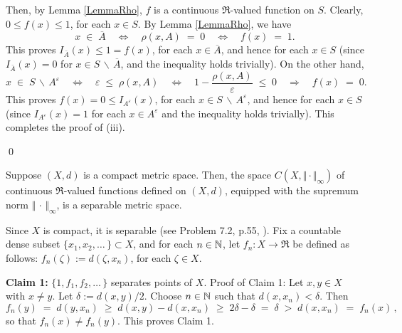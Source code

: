\begin{enumerate}
	Then, by Lemma \ref{LemmaRho}, $f$ is a continuous $\Re$-valued function on $S$.
	Clearly, $0 \leq f(x) \leq 1$, for each $x \in S$.
	By Lemma \ref{LemmaRho}, we have
	\begin{equation*}
	x \;\in\; \overline{A}
	\quad\Longleftrightarrow\quad
	\rho(x,A) \;=\; 0
	\quad\Longleftrightarrow\quad
	f(x) \; = \; 1.
	\end{equation*}
	This proves $I_{\bar{A}}(x) \leq 1 = f(x)$, for each $x \in \overline{A}$, and hence for each $x \in S$
	(since $I_{\bar{A}}(x) = 0$ for $x \in S\,\backslash\,\overline{A}$, and the inequality holds trivially).
	On the other hand,
	\begin{equation*}
	x \;\in\; S\,\backslash\,A^{\varepsilon}
	\quad\Longleftrightarrow\quad
	\varepsilon \;\leq\; \rho(x,A)
	\quad\Longleftrightarrow\quad
	1 - \dfrac{\rho(x,A)}{\varepsilon} \;\leq\; 0
	\quad\Longrightarrow\quad
	f(x) \;=\; 0.
	\end{equation*}
	This proves $f(x) = 0 \leq I_{A^{\varepsilon}}(x)$, for each $x \in S\,\backslash\,A^{\varepsilon}$,
	and hence for each $x \in S$ (since $I_{A^{\varepsilon}}(x) = 1$ for each $x \in A^{\varepsilon}$
	and the inequality holds trivially).
	This completes the proof of (iii).
\end{enumerate}
\qed


\begin{proposition}
\label{XCompactImpliesCXSeparable}
\mbox{}\vskip 0.1cm
\noindent
Suppose $(X,d)$ is a compact metric space.
Then, the space $C(X,\Vert\cdot\Vert_{\infty})$ of continuous $\Re$-valued
functions defined on $(X,d)$, equipped with the supremum norm $\Vert\,\cdot\,\Vert_{\infty}$,
is a separable metric space.
\end{proposition}
\proof
Since $X$ is compact, it is separable (see Problem 7.2, p.55, \cite{Aliprantis1998}).
Fix a countable dense subset $\{x_{1},x_{2},\ldots\,\} \subset X$, and
for each $n \in \mathbb{N}$, let $f_{n} : X \longrightarrow \Re$ be defined as follows:
$f_{n}(\zeta) := d(\zeta,x_{n})$, for each $\zeta \in X$.

\vskip 0.5cm
\noindent
\textbf{Claim 1:}\;\; $\{1, f_{1}, f_{2}, \ldots\,\}$ separates points of $X$.
\vskip 0.1cm
\noindent
Proof of Claim 1:\;\;
Let $x, y \in X$ with $x \neq y$. Let $\delta := d(x,y)/2$.
Choose $n \in \mathbb{N}$ such that $d(x,x_{n}) < \delta$. Then
\begin{equation*}
f_{n}(y) \;=\; d(y,x_{n}) \;\geq\; d(x,y) - d(x,x_{n}) \;\geq\; 2\delta - \delta \;=\; \delta \;>\; d(x,x_{n}) \;=\; f_{n}(x)\,,
\end{equation*}
so that $f_{n}(x) \neq f_{n}(y)$. This proves Claim 1.


